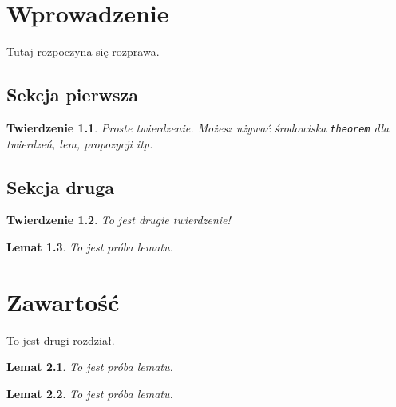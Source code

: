 \documentclass[polish]{uw-thesis}
\author{Imię Nazwisko}
\date{czerwiec 2026}
\newtheorem{theorem}{Twierdzenie}[chapter]
\newtheorem{lemma}[theorem]{Lemat}
\begin{document}
\makefrontmatter

\chapter{Wprowadzenie}
Tutaj rozpoczyna się rozprawa.

\section{Sekcja pierwsza}

\begin{theorem}
    Proste twierdzenie. Możesz używać środowiska \texttt{theorem} dla twierdzeń, lem, propozycji itp.
\end{theorem}

\cite{tarski_decision}

\section{Sekcja druga}

\begin{theorem}
    To jest drugie twierdzenie!
\end{theorem}

\begin{lemma}
To jest próba lematu.
\end{lemma}

\chapter{Zawartość}

To jest drugi rozdział.

\begin{lemma}
To jest próba lematu.
\end{lemma}

\begin{lemma}
To jest próba lematu.
\end{lemma}



\end{document}
